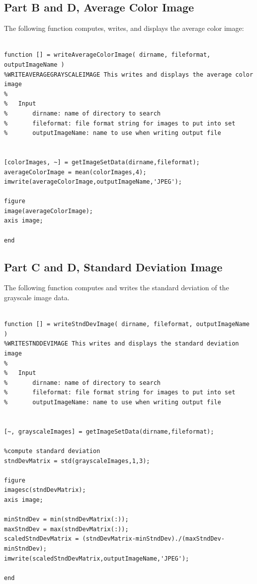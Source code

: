 \documentclass[11pt,psfig]{article}
\begin{document}
\subsection*{Part B and D, Average Color Image}

The following function computes, writes, and displays the average color image:

\begin{verbatim}

function [] = writeAverageColorImage( dirname, fileformat, outputImageName )
%WRITEAVERAGEGRAYSCALEIMAGE This writes and displays the average color image
%
%   Input
%       dirname: name of directory to search
%       fileformat: file format string for images to put into set
%       outputImageName: name to use when writing output file


[colorImages, ~] = getImageSetData(dirname,fileformat);
averageColorImage = mean(colorImages,4);
imwrite(averageColorImage,outputImageName,'JPEG');

figure
image(averageColorImage);
axis image;

end

\end{verbatim}

\subsection*{Part C and D, Standard Deviation Image}

The following function computes and writes the standard deviation of the grayscale image data. 

\begin{verbatim}

function [] = writeStndDevImage( dirname, fileformat, outputImageName )
%WRITESTNDDEVIMAGE This writes and displays the standard deviation image
%
%   Input
%       dirname: name of directory to search
%       fileformat: file format string for images to put into set
%       outputImageName: name to use when writing output file


[~, grayscaleImages] = getImageSetData(dirname,fileformat);

%compute standard deviation
stndDevMatrix = std(grayscaleImages,1,3);

figure
imagesc(stndDevMatrix);
axis image;

minStndDev = min(stndDevMatrix(:));
maxStndDev = max(stndDevMatrix(:));
scaledStndDevMatrix = (stndDevMatrix-minStndDev)./(maxStndDev-minStndDev);
imwrite(scaledStndDevMatrix,outputImageName,'JPEG');

end

\end{verbatim}
\end{document}
